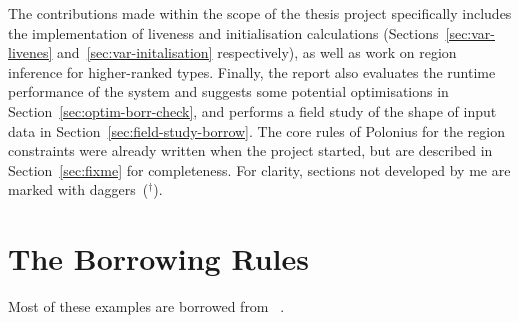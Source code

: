\documentclass[11pt,a4paper,twoside,openany]{report}
\newcommand{\notmine}[0] {$^\dagger$}
\begin{document}
The contributions made within the scope of the thesis project specifically
includes the implementation of liveness and initialisation calculations
(Sections~\ref{sec:var-livenes} and~\ref{sec:var-initalisation} respectively),
as well as work on region inference for higher-ranked types. Finally, the report
also evaluates the runtime performance of the system and suggests some potential
optimisations in Section~\ref{sec:optim-borr-check}, and performs a field study
of the shape of input data in Section~\ref{sec:field-study-borrow}. The core
rules of Polonius for the region constraints were already written when the
project started, but are described in Section~\ref{sec:fixme} for completeness.
For clarity, sections not developed by me are marked with daggers~(\notmine{}).

\section{The Borrowing Rules}\label{sec:borrowing-rules}
Most of these examples are borrowed from
\citeauthor{weiss_oxide:_2019}~\cite{weiss_oxide:_2019}.
\end{document}
